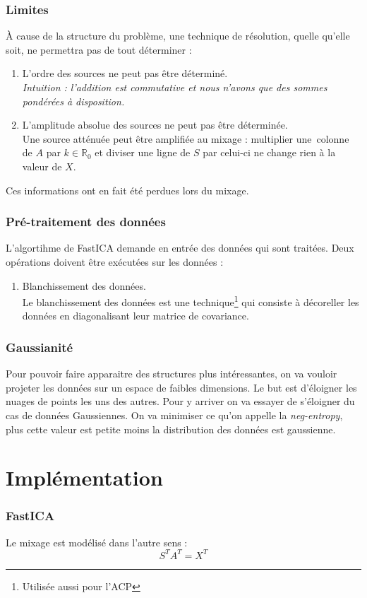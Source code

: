 \documentclass[compress]{beamer}
\newcommand{\esR}{\mathbb{R}}
\begin{document}
\begin{frame}
	\frametitle{Limites}
	À cause de la structure du problème, une technique de résolution,
	quelle qu'elle soit, ne permettra pas de tout déterminer :
	\pause
	\begin{enumerate}
	\item L'ordre des sources ne peut pas être déterminé.
	\pause
		\\\textit{Intuition : l'addition est commutative et nous n'avons que
			des sommes pondérées à disposition.}
	\pause
	\item L'amplitude absolue des sources ne peut pas être déterminée.
	\pause
		\\Une source atténuée peut être amplifiée au mixage :
			multiplier une~colonne de $A$ par $k\in\esR_0$ et
			diviser une ligne de $S$ par celui-ci ne change rien à
			la valeur de $X$.
	\pause
	\end{enumerate}

	Ces informations ont en fait été perdues lors du mixage.
\end{frame}
\begin{frame}
	\frametitle{Pré-traitement des données}
	L'algortihme de FastICA demande en entrée des données qui sont traitées.
	Deux opérations doivent être exécutées sur les données :
	\pause
	\begin{enumerate}
	\item Blanchissement des données.
		\pause
			\\Le blanchissement des données est une
			technique\footnote{Utilisée aussi pour l'ACP}
			qui consiste à décoreller les données en diagonalisant
			leur matrice de covariance.
	\pause
	
	\end{enumerate}
\end{frame}
\begin{frame}
	\frametitle{Gaussianité}
	Pour pouvoir faire apparaitre des structures plus intéressantes,
	on va vouloir projeter les données sur un espace de faibles dimensions.
	Le but est d'éloigner les nuages de points les uns des autres.
	Pour y arriver on va essayer de s'éloigner du cas de données Gaussiennes.
	On va minimiser ce qu'on appelle la \textit{neg-entropy},
	plus cette valeur est petite moins la distribution des données
	est gaussienne.
\end{frame}


\section{Implémentation}
\begin{frame}
	\frametitle{FastICA}
	Le mixage est modélisé dans l'autre sens :
	\[
		S^TA^T=X^T
	\]
\end{frame}
\end{document}
